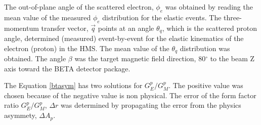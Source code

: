 \documentclass[12pt]{article}
\begin{document}
The out-of-plane angle of the scattered electron, $\phi_e$ was obtained by reading the mean value of the measured $\phi_e$ distribution for the elastic events. The three-momentum transfer vector, $\vec{q}$ points at an angle $\theta_q$, which is the scattered proton angle, determined (measured) event-by-event for the elastic kinematics of the electron (proton) in the HMS. The mean value of the $\theta_q$ distribution was obtained. The angle $\beta$ was the target magnetic field direction, 80$^{\circ}$ to the beam Z axis toward the BETA detector package. 

The Equation \eqref{btasym} has two solutions for $G_E^p/G_M^p$. The positive value was chosen because of the negative value is non physical. The error of the form factor ratio $G_E^p/G_M^p$, $\Delta r$ was determined by propagating the error from the physics asymmety, $\Delta A_p$.
\end{document}
